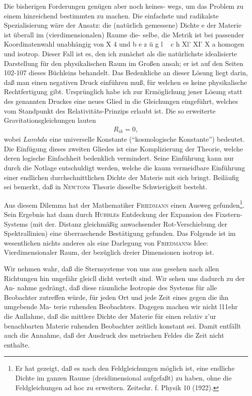 Die bisherigen Forderungen genügen aber noch keines-
wegs, um das Problem zu einem hinreichend bestimmten
zu machen. Die einfachste und radikalste Spezialisierung
wäre der Ansatz: die (natürlich gemessene) Dichte e der
Materie ist überall im (vierdimensionalen) Raume die-
selbe, die Metrik ist bei passender Koordinatenwahl
unabhängig von X 4 und
b
e
z
ü
g
l
~
c
h
Xl' XI' X a homogen
und isotrop. Dieser Fall ist es, den ich zunächst als die natürlichste idealisierte Darstellung für den physikalischen Raum im Großen ansah; er ist auf den Seiten 102-107 dieses Büchleins behandelt. Das Bedenkliche an dieser Lösung liegt darin, daß man einen negativen Druck einführen muß, für welchen es keine physikalische Rechtfertigung gibt. Ursprünglich habe ich zur Ermöglichung jener Lösung statt des genannten Druckes eine neues Glied in die Gleichungen eingeführt, welches vom Standpunkt des Relativitäts-Prinzips erlaubt ist. Die so erweiterte Gravitationsgleichungen lauten
\begin{align}
    R_{ik} = 0,
\end{align}
wobei $Lambda$ eine universelle Konstante (\enquote{kosmologische Konstante}) bedeutet. Die Einfügung dieses zweiten Gliedes ist eine Komplizierung der Theorie, welche deren logische Einfachheit bedenklich vermindert. Seine Einführung kann nur durch die Notlage entschuldigt werden, welche die kaum vermeidbare Einführung einer endlichen durchschnittlichen Dichte der Materie mit sich bringt. Beiläufig sei bemerkt, daß in \textsc{Newton}s Theorie dieselbe Schwierigkeit besteht.

Aus diesem Dilemma hat der Mathematiker \textsc{Friedmann} einen Ausweg gefunden\footnote{Er hat gezeigt, daß es nach den Feldgleichungen möglich ist, eine endliche Dichte im ganzen Raume (dreidimensional aufgefaßt) zu haben, ohne die Feldgleichungen ad hoc zu erweitern. Zeitschr. f. Physik 10 (1922).}. Sein Ergebnis hat dann durch \textsc{Hubble}s Entdeckung der Expansion des Fixstern-Systems (mit der. Distanz gleichmäßig anwachsender Rot-Verschiebung der Spektrallinien) eine überraschende Bestätigung gefunden. Das Folgende ist im wesentlichen nichts anderes als eine Darlegung von \textsc{Friedmann}s Idee: Vierdimensionaler Raum, der bezüglich dreier Dimensionen isotrop ist.

Wir nehmen wahr, daß die Sternsysteme von uns
aus gesehen nach allen Richtungen hin ungefähr gleicll
dicht verteilt sind. Wir sehen uns dadurch zu der An-
nahme gedrängt, daß diese räumliche Isotropie des
Systems für alle Beobachter zutreffen würde, für jeden
Ort und jede Zeit eines gegen die ihn umgebende Ma-
terie ruhenden Beobachters. Dagegen machen wir nicht
l11ehr die Anllahme, daß die mittlere Dichte der Materie
für einen relativ z'ur benachbarten Materie ruhenden
Beobachter zeitlich konstant sei. Damit entfällt auch
die Annahme, daß der Ausdruck des metrischen Feldes
die Zeit nicht enthalte.

